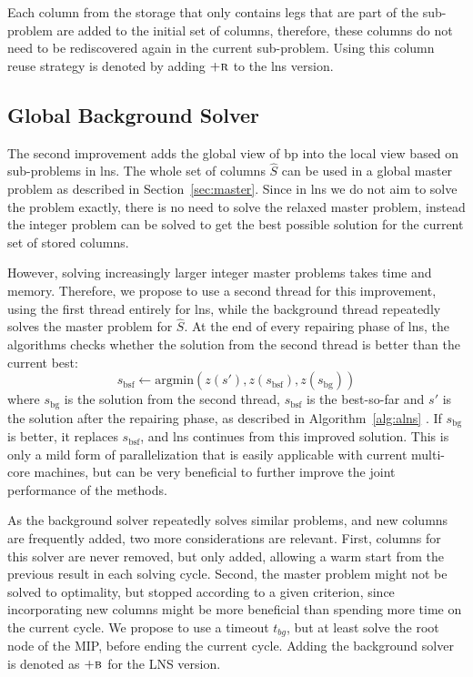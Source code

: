 \documentclass[]{amsart}
\newcommand{\argmin}{\text{argmin}}
\theoremstyle{plain}
\begin{document}
\noindent
Each column from the storage that only contains legs that are part of the sub-problem are added to the initial set of columns, therefore, these columns do not need to be rediscovered again in the current sub-problem. Using this column reuse strategy is denoted by adding $\textsc{+r}$ to the \gls{lns} version.

\subsection{Global Background Solver}\label{sec:background}

The second improvement adds the global view of \gls{bp} into the local view based on sub-problems in \gls{lns}. The whole set of columns $\hat{S}$ can be used in a global master problem as described in Section~\ref{sec:master}. Since in \gls{lns} we do not aim to solve the problem exactly, there is no need to solve the relaxed master problem, instead the integer problem can be solved to get the best possible solution for the current set of stored columns.

However, solving increasingly larger integer master problems takes time and memory. Therefore, we propose to use a second thread for this improvement, using the first thread entirely for \gls{lns}, while the background thread repeatedly solves the master problem for $\hat{S}$. At the end of every repairing phase of \gls{lns}, the algorithms checks whether the solution from the second thread is better than the current best: 
\[s_\text{bsf}\gets \argmin\left(z(s'), z(s_\text{bsf}), z(s_\text{bg})\right)\] where $s_\text{bg}$ is the solution from the second thread, $s_\text{bsf}$ is the best-so-far and $s'$ is the solution after the repairing phase, as described in Algorithm~\ref{alg:alns} . If $s_\text{bg}$ is better, it replaces $s_\text{bsf}$, and \gls{lns} continues from this improved solution. This is only a mild form of parallelization that is easily applicable with current multi-core machines, but can be very beneficial to further improve the joint performance of the methods.

As the background solver repeatedly solves similar problems, and new columns are frequently added, two more considerations are relevant. First, columns for this solver are never removed, but only added, allowing a warm start from the previous result in each solving cycle. Second, the master problem might not be solved to optimality, but stopped according to a given criterion, since incorporating new columns might be more beneficial than spending more time on the current cycle. We propose to use a timeout $t_{bg}$, but at least solve the root node of the MIP, before ending the current cycle. Adding the background solver is denoted as $\textsc{+b}$ for the LNS version.
\end{document}
